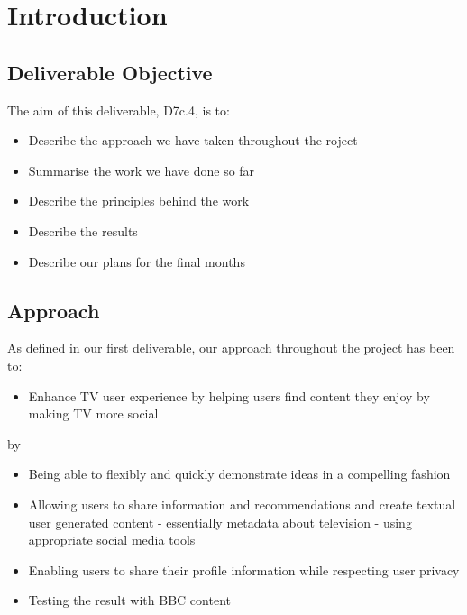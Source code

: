 \documentclass{notube}
\begin{document}
\maketitle

%

\chapter{Introduction}

\section{Deliverable Objective}

The aim of this deliverable, D7c.4, is to:
\begin{itemize}
\item{Describe the approach we have taken throughout the roject}
\item{Summarise the work we have done so far}
\item{Describe the principles behind the work}
\item{Describe the results}
\item{Describe our plans for the final months}
\end{itemize}


\section{Approach}

As defined in our first deliverable, our approach throughout the project has been to:

\begin{itemize}
\item{Enhance TV user experience by helping users find content they enjoy by making TV more social}
\end{itemize}

by

\begin{itemize}
\item{Being able to flexibly and quickly demonstrate ideas in a compelling fashion}
\item{Allowing users to share information and recommendations and create textual user generated content - essentially metadata about television - using appropriate social media tools}
\item{Enabling users to share their profile information while respecting user privacy}
\item{Testing the result with BBC content}
\end{itemize}
\end{document}
